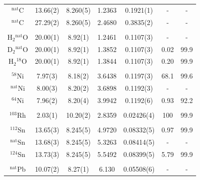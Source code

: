 \documentclass[twocolumn,secnumarabic,amssymb, nobibnotes, aps, prl,
superscriptaddress, nobalancelastpage]{revtex4}
\begin{document}
\begin{table}[tb]
\begin{center}
\begin{tabular}{ c c c c c c c }
            $^{\text{nat}}$C & 13.66(2) & 8.260(5) & 1.2363
            & 0.1921(1) & - & -\\
            $^{\text{nat}}$C & 27.29(2) & 8.260(5) & 2.4680
            & 0.3835(2) & - & -\\
            \\
            H$_{2}$$^{\text{nat}}$O & 20.00(1) & 8.92(1) & 1.2461 & 0.1107(3) & - &
            - \\
            D$_{2}$$^{\text{nat}}$O & 20.00(1) & 8.92(1) & 1.3852 & 0.1107(3) &
            0.02 &
            99.9 \\
            H$_{2}$$^{18}$O & 20.00(1) & 8.92(1) & 1.3844 & 0.1107(3) & 0.20 &
            99.9\\
            \\
            $^{58}$Ni & 7.97(3)& 8.18(2) &
            3.6438 & 0.1197(3)& 68.1 & 99.6 \\
            $^{\text{nat}}$Ni & 8.00(3) & 8.20(2) &
            3.6898 & 0.1192(3)& - & -\\
            $^{64}$Ni & 7.96(2) & 8.20(4) &
            3.9942 & 0.1192(6) & 0.93 & 92.2\\
            \\
            $^{103}$Rh & 2.03(1) & 10.20(2) & 2.8359 & 0.02426(4) & 100 & 99.9\\
            \\
            $^{112}$Sn & 13.65(3) & 8.245(5) &
            4.9720 & 0.08332(5) & 0.97 & 99.9\\
            $^{\text{nat}}$Sn & 13.68(3) & 8.245(5) &
            5.3263 & 0.08414(5) & - & -\\
            $^{124}$Sn & 13.73(3) & 8.245(5) &
            5.5492 & 0.08399(5) & 5.79 & 99.9\\
            \\
            $^{\text{nat}}$Pb & 10.07(2) & 8.27(1) & 6.130 &
            0.05508(6) & - & -\\
            \hline
        \end{tabular}
    \end{center}
\end{table}
\end{document}
